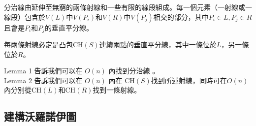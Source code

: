\documentclass[15pt]{extarticle}
\begin{document}
\begin{lemma}
    分治線由延伸至無窮的兩條射線和一些有限的線段組成。每一個元素（一射線或一線段）包含於$V(L)$中$V(P_i)$和$V(R)$中$V(P_j)$相交的部分，其中$P_i\in L, P_j\in R$且會是$P_i$和$P_j$的垂直平分線。
\end{lemma}

\begin{lemma}
    每兩條射線必定是凸包CH$(S)$連續兩點的垂直平分線，其中一條位於$L$，另一條位於$R$。
\end{lemma}

Lemma 1 告訴我們可以在 $O(n)$ 內找到分治線 。\\

Lemma 2 告訴我們可以在 $O(n)$ 內在 CH$(S)$找到所述射線，同時可在$O(n)$內分別從CH$(L)$和CH$(R)$找到一條射線。

\subsection{建構沃羅諾伊圖}
\end{document}
